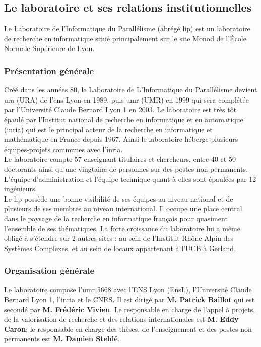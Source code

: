 \subsection{Le laboratoire et ses relations institutionnelles}
Le Laboratoire de l'Informatique du Parallélisme (abrégé \gls{lip}) est un laboratoire de recherche en informatique situé principalement sur le site Monod de l'École Normale Supérieure de Lyon.

\subsubsection{Présentation générale}
Créé dans les années 80, le Laboratoire de L'Informatique du Parallélisme devient \gls{ura} (URA) de l'\gls{ens} Lyon en 1989, puis \gls{umr} (UMR) en 1999 qui sera complétée par l'Université Claude Bernard Lyon 1 en 2003. Le laboratoire est très tôt épaulé par l'Institut national de recherche en informatique et en automatique (\gls{inria}) qui est le principal acteur de la recherche en informatique et mathématique en France depuis 1967. Ainsi le laboratoire héberge plusieurs équipes-projets communes avec l'\gls{inria}. \cite{reportHCERES}\\

Le laboratoire compte 57 enseignant titulaires et chercheurs, entre 40 et 50 doctorants ainsi qu'une vingtaine de personnes sur des postes non permanents. L'équipe d'administration et l'équipe technique quant-à-elles sont épaulées par 12 ingénieurs.\\

Le \gls{lip} possède une bonne visibilité de ses équipes au niveau national et de plusieurs de ses membres au niveau international. Il occupe une place central dans le paysage de la recherche en informatique français pour quasiment l'ensemble de ses thématiques. La forte croissance du laboratoire lui a même obligé à s'étendre sur 2 autres sites : au sein de l’Institut Rhône-Alpin des Systèmes Complexes, et au sein de locaux appartenant à l’UCB à Gerland.

\subsubsection{Organisation générale}
Le laboratoire compose l'\gls{umr} 5668 avec l'ENS Lyon (EnsL), l'Université Claude Bernard Lyon 1, l'\gls{inria} et le CNRS. Il est dirigé par \textbf{M. Patrick Baillot} qui est secondé par \textbf{M. Frédéric Vivien}. Le responsable en charge de l'appel à projets, de la valorisation de recherche et des relations internationales est \textbf{M. Eddy Caron}; le responsable en charge des thèses, de l'enseignement et des postes non permanents est \textbf{M. Damien Stehlé}.

